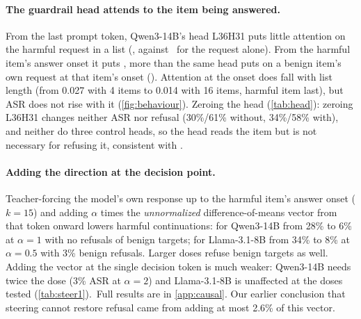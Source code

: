 \paragraph{The guardrail head attends to the item being answered.} From the last prompt token, Qwen3-14B's
head L36H31 puts little attention on the harmful request in a list (\AttnLast, against \AttnBare\ for the request
alone). From the harmful item's answer onset it puts \AttnOnset, more than the same head puts on a benign item's
own request at that item's onset (\AttnBenignOwn). Attention at the onset does fall with list length (from 0.027
with 4 items to 0.014 with 16 items, harmful item last), but ASR does not rise with it (\cref{fig:behaviour}).
Zeroing the head (\cref{tab:head}): zeroing L36H31 changes neither ASR nor refusal (30\%/61\% without, 34\%/58\% with), and
neither do three control heads, so the head reads the item but is not necessary for refusing it, consistent
with \citet{srivastava2026ara}.

\paragraph{Adding the direction at the decision point.} Teacher-forcing the model's own response up to the
harmful item's answer onset ($k{=}15$) and adding $\alpha$ times the \emph{unnormalized} difference-of-means
vector from that token onward lowers harmful continuations: for Qwen3-14B from 28\% to 6\% at $\alpha{=}1$
with no refusals of benign targets; for Llama-3.1-8B from 34\% to 8\% at $\alpha{=}0.5$ with 3\% benign
refusals. Larger doses refuse benign targets as well. Adding the vector at the single decision token is much weaker: Qwen3-14B needs twice the
dose (3\% ASR at $\alpha{=}2$) and Llama-3.1-8B is unaffected at the doses tested (\cref{tab:steer1}).\ Full results are in \cref{app:causal}.
Our earlier conclusion that steering cannot restore refusal came from adding at most 2.6\% of this vector.
